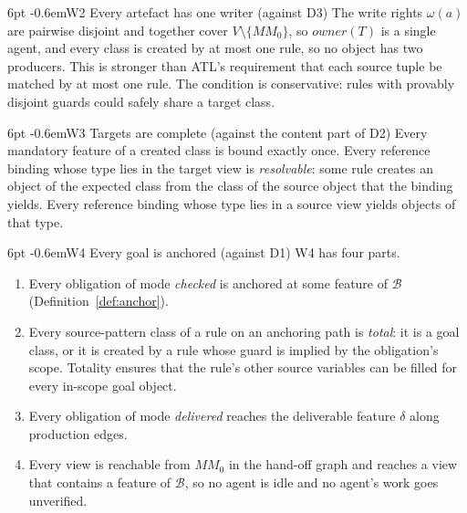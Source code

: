 \documentclass[pdflatex,sn-mathphys-num]{sn-jnl}
\makeatletter
\theoremstyle{thmstyleone}%
\theoremstyle{thmstyletwo}%
\theoremstyle{thmstylethree}%
\newcommand{\W}[1]{\textsf{W#1}}
\newcommand{\D}[1]{\textsf{D#1}}
\newcommand{\MM}{\mathit{MM}}
\renewcommand\paragraph{\@startsection{paragraph}{4}{\z@}%
  {6pt \@plus 2pt \@minus 1pt}{-0.6em}{\normalfont\normalsize\bfseries}}
\makeatother
\begin{document}
\paragraph{\W{2} Every artefact has one writer (against \D{3})} The write
rights $\omega(a)$ are pairwise disjoint and together cover
$V\setminus\{\MM_0\}$, so $\mathit{owner}(T)$ is a single agent, and every
class is created by at most one rule, so no object has two producers. This is
stronger than ATL's requirement that each source tuple be matched by at most
one rule. The condition is conservative: rules with provably disjoint guards
could safely share a target class.

\paragraph{\W{3} Targets are complete (against the content part of \D{2})}
Every mandatory feature of a created class is bound exactly once. Every
reference binding whose type lies in the target view is \emph{resolvable}: some
rule creates an object of the expected class from the class of the source
object that the binding yields. Every reference binding whose type lies in a
source view yields objects of that type.

\paragraph{\W{4} Every goal is anchored (against \D{1})} \W{4} has four parts.
\begin{enumerate}[label=(\alph*), leftmargin=2em, itemsep=1pt, topsep=2pt]
\item Every obligation of mode \emph{checked} is anchored at some feature of
$\mathcal{B}$ (Definition~\ref{def:anchor}).
\item Every source-pattern class of a rule on an anchoring path is
\emph{total}: it is a goal class, or it is created by a rule whose guard is
implied by the obligation's scope. Totality ensures that the rule's other source
variables can be filled for every in-scope goal object.
\item Every obligation of mode \emph{delivered} reaches the deliverable feature
$\delta$ along production edges.
\item Every view is reachable from $\MM_0$ in the hand-off graph and reaches a
view that contains a feature of $\mathcal{B}$, so no agent is idle and no
agent's work goes unverified.
\end{enumerate}
\end{document}
